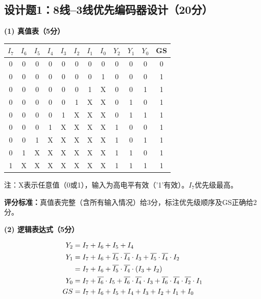\subsection{设计题1：8线--3线优先编码器设计（20分）}

\textbf{(1) 真值表（5分）}

\begin{center}
\begin{tabular}{|c|c|c|c|c|c|c|c|c|c|c|c|}
\hline
$I_7$ & $I_6$ & $I_5$ & $I_4$ & $I_3$ & $I_2$ & $I_1$ & $I_0$ & $Y_2$ & $Y_1$ & $Y_0$ & GS \\
\hline
0 & 0 & 0 & 0 & 0 & 0 & 0 & 0 & 0 & 0 & 0 & 0 \\
0 & 0 & 0 & 0 & 0 & 0 & 0 & 1 & 0 & 0 & 0 & 1 \\
0 & 0 & 0 & 0 & 0 & 0 & 1 & X & 0 & 0 & 1 & 1 \\
0 & 0 & 0 & 0 & 0 & 1 & X & X & 0 & 1 & 0 & 1 \\
0 & 0 & 0 & 0 & 1 & X & X & X & 0 & 1 & 1 & 1 \\
0 & 0 & 0 & 1 & X & X & X & X & 1 & 0 & 0 & 1 \\
0 & 0 & 1 & X & X & X & X & X & 1 & 0 & 1 & 1 \\
0 & 1 & X & X & X & X & X & X & 1 & 1 & 0 & 1 \\
1 & X & X & X & X & X & X & X & 1 & 1 & 1 & 1 \\
\hline
\end{tabular}
\end{center}

注：X表示任意值（0或1），输入为高电平有效（'1'有效）。$I_7$优先级最高。

\textbf{评分标准：}真值表完整（含所有输入情况）给3分，标注优先级顺序及GS正确给2分。

\vspace{0.3cm}

\textbf{(2) 逻辑表达式（5分）}

\begin{align}
Y_2 &= I_7 + I_6 + I_5 + I_4 \notag \\
Y_1 &= I_7 + I_6 + \overline{I_5}\cdot\overline{I_4}\cdot I_3 + \overline{I_5}\cdot\overline{I_4}\cdot I_2 \notag \\
    &= I_7 + I_6 + \overline{I_5}\cdot\overline{I_4}\cdot(I_3 + I_2) \notag \\
Y_0 &= I_7 + \overline{I_6}\cdot I_5 + \overline{I_6}\cdot\overline{I_4}\cdot I_3 + \overline{I_6}\cdot\overline{I_4}\cdot\overline{I_2}\cdot I_1 \notag \\
GS  &= I_7 + I_6 + I_5 + I_4 + I_3 + I_2 + I_1 + I_0 \notag
\end{align}

